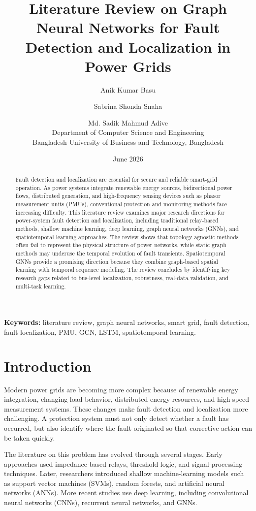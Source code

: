 \documentclass[12pt,a4paper]{article}
\title{\textbf{Literature Review on Graph Neural Networks for Fault Detection and Localization in Power Grids}}
\author{
Anik Kumar Basu \and
Sabrina Shonda Snaha \and
Md. Sadik Mahmud Adive\\
Department of Computer Science and Engineering\\
Bangladesh University of Business and Technology, Bangladesh
}
\date{June 2026}
\begin{document}
\maketitle

\begin{abstract}
Fault detection and localization are essential for secure and reliable smart-grid operation. As power systems integrate renewable energy sources, bidirectional power flows, distributed generation, and high-frequency sensing devices such as phasor measurement units (PMUs), conventional protection and monitoring methods face increasing difficulty. This literature review examines major research directions for power-system fault detection and localization, including traditional relay-based methods, shallow machine learning, deep learning, graph neural networks (GNNs), and spatiotemporal learning approaches. The review shows that topology-agnostic methods often fail to represent the physical structure of power networks, while static graph methods may underuse the temporal evolution of fault transients. Spatiotemporal GNNs provide a promising direction because they combine graph-based spatial learning with temporal sequence modeling. The review concludes by identifying key research gaps related to bus-level localization, robustness, real-data validation, and multi-task learning.
\end{abstract}

\noindent\textbf{Keywords:} literature review, graph neural networks, smart grid, fault detection, fault localization, PMU, GCN, LSTM, spatiotemporal learning.

\section{Introduction}

Modern power grids are becoming more complex because of renewable energy integration, changing load behavior, distributed energy resources, and high-speed measurement systems. These changes make fault detection and localization more challenging. A protection system must not only detect whether a fault has occurred, but also identify where the fault originated so that corrective action can be taken quickly.

The literature on this problem has evolved through several stages. Early approaches used impedance-based relays, threshold logic, and signal-processing techniques. Later, researchers introduced shallow machine-learning models such as support vector machines (SVMs), random forests, and artificial neural networks (ANNs). More recent studies use deep learning, including convolutional neural networks (CNNs), recurrent neural networks, and GNNs.
\end{document}
